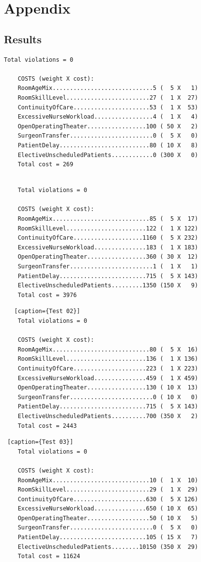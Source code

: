 \appendix

\section{Appendix}
\subsection{Results}
\begin{lstlisting}[caption={Toy}]
    Total violations = 0

    COSTS (weight X cost): 
    RoomAgeMix.............................5 (  5 X   1)
    RoomSkillLevel........................27 (  1 X  27)
    ContinuityOfCare......................53 (  1 X  53)
    ExcessiveNurseWorkload.................4 (  1 X   4)
    OpenOperatingTheater.................100 ( 50 X   2)
    SurgeonTransfer........................0 (  5 X   0)
    PatientDelay..........................80 ( 10 X   8)
    ElectiveUnscheduledPatients............0 (300 X   0)
    Total cost = 269
\end{lstlisting}
\begin{lstlisting}[caption={Test 01}]

    Total violations = 0
    
    COSTS (weight X cost): 
    RoomAgeMix............................85 (  5 X  17)
    RoomSkillLevel.......................122 (  1 X 122)
    ContinuityOfCare....................1160 (  5 X 232)
    ExcessiveNurseWorkload...............183 (  1 X 183)
    OpenOperatingTheater.................360 ( 30 X  12)
    SurgeonTransfer........................1 (  1 X   1)
    PatientDelay.........................715 (  5 X 143)
    ElectiveUnscheduledPatients.........1350 (150 X   9)
    Total cost = 3976
\end{lstlisting}
\begin{lstlisting}   [caption={Test 02}]
    Total violations = 0
    
    COSTS (weight X cost): 
    RoomAgeMix............................80 (  5 X  16)
    RoomSkillLevel.......................136 (  1 X 136)
    ContinuityOfCare.....................223 (  1 X 223)
    ExcessiveNurseWorkload...............459 (  1 X 459)
    OpenOperatingTheater.................130 ( 10 X  13)
    SurgeonTransfer........................0 ( 10 X   0)
    PatientDelay.........................715 (  5 X 143)
    ElectiveUnscheduledPatients..........700 (350 X   2)
    Total cost = 2443
\end{lstlisting}
\begin{lstlisting} [caption={Test 03}]
    Total violations = 0
    
    COSTS (weight X cost): 
    RoomAgeMix............................10 (  1 X  10)
    RoomSkillLevel........................29 (  1 X  29)
    ContinuityOfCare.....................630 (  5 X 126)
    ExcessiveNurseWorkload...............650 ( 10 X  65)
    OpenOperatingTheater..................50 ( 10 X   5)
    SurgeonTransfer........................0 (  5 X   0)
    PatientDelay.........................105 ( 15 X   7)
    ElectiveUnscheduledPatients........10150 (350 X  29)
    Total cost = 11624
\end{lstlisting}
